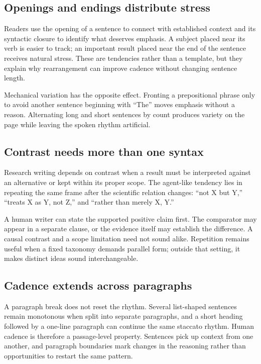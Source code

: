 \subsection{Openings and endings distribute stress}

Readers use the opening of a sentence to connect with established context and
its syntactic closure to identify what deserves emphasis. A subject placed
near its verb is easier to track; an important result placed near the end of
the sentence receives natural stress. These are tendencies rather than a
template, but they explain why rearrangement can improve cadence without
changing sentence length.

Mechanical variation has the opposite effect. Fronting a prepositional phrase
only to avoid another sentence beginning with ``The'' moves emphasis without a
reason. Alternating long and short sentences by count produces variety on the
page while leaving the spoken rhythm artificial.

\subsection{Contrast needs more than one syntax}

Research writing depends on contrast when a result must be interpreted against
an alternative or kept within its proper scope. The agent-like tendency lies
in repeating the same frame after the scientific relation changes:
``not X but Y,'' ``treats X as Y, not Z,'' and ``rather than merely X, Y.''

A human writer can state the supported positive claim first. The comparator
may appear in a separate clause, or the evidence itself may establish the
difference. A causal contrast and a scope limitation need not sound alike.
Repetition remains useful when a fixed taxonomy demands parallel form; outside
that setting, it makes distinct ideas sound interchangeable.

\subsection{Cadence extends across paragraphs}

A paragraph break does not reset the rhythm. Several list-shaped sentences remain
monotonous when split into separate paragraphs, and a short heading followed by
a one-line paragraph can continue the same staccato rhythm. Human cadence is
therefore a passage-level property. Sentences pick up context from one another,
and paragraph boundaries mark changes in the reasoning rather than
opportunities to restart the same pattern.
